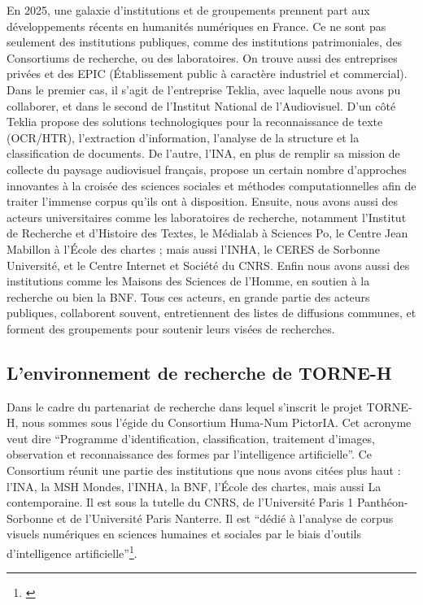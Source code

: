 En 2025, une galaxie d'institutions et de groupements prennent part aux développements récents en humanités numériques en France. Ce ne sont pas seulement des institutions publiques, comme des institutions patrimoniales, des Consortiums de recherche, ou des laboratoires. On trouve aussi des entreprises privées et des EPIC (Établissement public à caractère industriel et commercial). Dans le premier cas, il s'agit de l'entreprise Teklia, avec laquelle nous avons pu collaborer, et dans le second de l'Institut National de l'Audiovisuel. D'un côté Teklia propose des solutions technologiques pour la reconnaissance de texte (OCR/HTR), l'extraction d'information, l'analyse de la structure et la classification de documents. De l'autre, l'INA, en plus de remplir sa mission de collecte du paysage audiovisuel français, propose un certain nombre d'approches innovantes à la croisée des sciences sociales et méthodes computationnelles afin de traiter l'immense corpus qu'ils ont à disposition. Ensuite, nous avons aussi des acteurs universitaires comme les laboratoires de recherche, notamment l'Institut de Recherche et d'Histoire des Textes, le Médialab à Sciences Po, le Centre Jean Mabillon à l'École des chartes ; mais aussi l'INHA, le CERES de Sorbonne Université, et le Centre Internet et Société du CNRS. Enfin nous avons aussi des institutions comme les Maisons des Sciences de l'Homme, en soutien à la recherche ou bien la BNF. Tous ces acteurs, en grande partie des acteurs publiques, collaborent souvent, entretiennent des listes de diffusions communes, et forment des groupements pour soutenir leurs visées de recherches.

\subsection{L'environnement de recherche de TORNE-H}

Dans le cadre du partenariat de recherche dans lequel s'inscrit le projet TORNE-H, nous sommes sous l'égide du Consortium Huma-Num PictorIA. Cet acronyme veut dire \enquote{Programme d'identification, classification, traitement d'images, observation et reconnaissance des formes par l'intelligence artificielle}. Ce Consortium réunit une partie des institutions que nous avons citées plus haut : l'INA, la MSH Mondes, l'INHA, la BNF, l'École des chartes, mais aussi La contemporaine. Il est sous la tutelle du CNRS, de l'Université Paris 1 Panthéon-Sorbonne et de l'Université Paris Nanterre. Il est \enquote{dédié à l’analyse de corpus visuels numériques en sciences humaines et sociales par le biais d’outils d’intelligence artificielle}\footnote{\cite{noauthor_pictoria_nodate}}.

